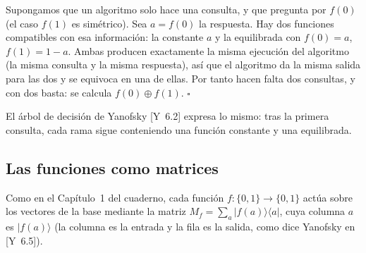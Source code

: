 \documentclass[11pt, a4paper, twoside, openright]{report}
\providecommand{\ket}[1]{|#1\rangle}
\providecommand{\bra}[1]{\langle #1|}
\newcommand{\Yan}[1]{\textcolor{rosaviejo}{\small[Y~#1]}}  %
\begin{document}
\begin{demo}
Supongamos que un algoritmo solo hace una consulta, y que pregunta por $f(0)$ (el caso $f(1)$ es simétrico). Sea $a = f(0)$ la respuesta. Hay dos funciones compatibles con esa información: la constante $a$ y la equilibrada con $f(0) = a$, $f(1) = 1-a$. Ambas producen exactamente la misma ejecución del algoritmo (la misma consulta y la misma respuesta), así que el algoritmo da la misma salida para las dos y se equivoca en una de ellas. Por tanto hacen falta dos consultas, y con dos basta: se calcula $f(0)\oplus f(1)$. \hfill$\square$
\end{demo}

\noindent El árbol de decisión de Yanofsky \Yan{6.2} expresa lo mismo: tras la primera consulta, cada rama sigue conteniendo una función constante y una equilibrada.

\begin{center}
\end{center}

\subsection{Las funciones como matrices}

\noindent Como en el Capítulo~1 del cuaderno, cada función $f:\{0,1\}\to\{0,1\}$ actúa sobre los vectores de la base mediante la matriz $M_f = \sum_a \ket{f(a)}\bra{a}$, cuya columna $a$ es $\ket{f(a)}$ (la columna es la entrada y la fila es la salida, como dice Yanofsky en \Yan{6.5}).
\end{document}
